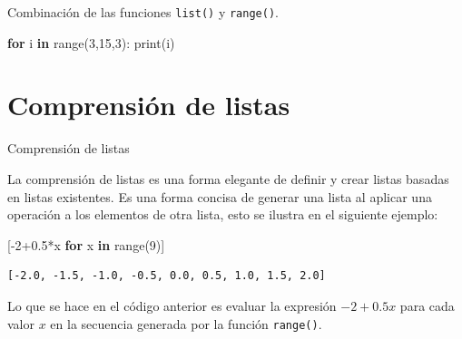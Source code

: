 \documentclass[
  ignorenonframetext,
  aspectratio=169,
  spanish,
]{beamer}
\newenvironment{Shaded}{\begin{snugshade}}{\end{snugshade}}
\newcommand{\BuiltInTok}[1]{\textcolor[rgb]{0.00,0.23,0.31}{#1}}
\newcommand{\ControlFlowTok}[1]{\textcolor[rgb]{0.00,0.23,0.31}{\textbf{#1}}}
\newcommand{\DecValTok}[1]{\textcolor[rgb]{0.68,0.00,0.00}{#1}}
\newcommand{\FloatTok}[1]{\textcolor[rgb]{0.68,0.00,0.00}{#1}}
\newcommand{\KeywordTok}[1]{\textcolor[rgb]{0.00,0.23,0.31}{\textbf{#1}}}
\newcommand{\NormalTok}[1]{\textcolor[rgb]{0.00,0.23,0.31}{#1}}
\newcommand{\OperatorTok}[1]{\textcolor[rgb]{0.37,0.37,0.37}{#1}}
\begin{document}
\begin{frame}[fragile]{Combinación de las funciones \texttt{list()} y
\texttt{range()}.}
\label{combinaciuxf3n-de-las-funciones-list-y-range.-3}
\begin{Shaded}
\begin{Highlighting}[]
\ControlFlowTok{for}\NormalTok{ i }\KeywordTok{in} \BuiltInTok{range}\NormalTok{(}\DecValTok{3}\NormalTok{,}\DecValTok{15}\NormalTok{,}\DecValTok{3}\NormalTok{):}
  \BuiltInTok{print}\NormalTok{(i)}
\end{Highlighting}
\end{Shaded}
\end{frame}

\section{Comprensión de listas}\label{comprensiuxf3n-de-listas}

\begin{frame}[fragile]{Comprensión de listas}
\label{sec-ComprensionDeListas}

La comprensión de listas es una forma elegante de definir y crear listas
basadas en listas existentes. Es una forma concisa de generar una lista
al aplicar una operación a los elementos de otra lista, esto se ilustra
en el siguiente ejemplo:

\begin{Shaded}
\begin{Highlighting}[]
\NormalTok{[}\OperatorTok{{-}}\DecValTok{2}\OperatorTok{+}\FloatTok{0.5}\OperatorTok{*}\NormalTok{x }\ControlFlowTok{for}\NormalTok{ x }\KeywordTok{in} \BuiltInTok{range}\NormalTok{(}\DecValTok{9}\NormalTok{)]}
\end{Highlighting}
\end{Shaded}

\begin{verbatim}
[-2.0, -1.5, -1.0, -0.5, 0.0, 0.5, 1.0, 1.5, 2.0]
\end{verbatim}

Lo que se hace en el código anterior es evaluar la expresión \(-2+0.5x\)
para cada valor \(x\) en la secuencia generada por la función
\texttt{range()}.
\end{frame}
\end{document}
